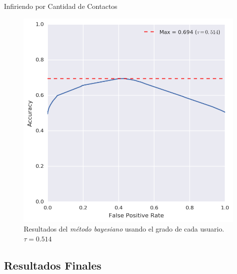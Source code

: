 \documentclass[usenames,dvipsnames,table]{beamer}
\begin{document}
\begin{frame}{Infiriendo por Cantidad de Contactos}
\begin{figure}
		\includegraphics[width=.49\framewidth, height=.37\textheight, keepaspectratio]{bayes/accuracy_contacts.png}

		\caption{Resultados del \emph{método bayesiano} usando el grado de cada usuario. $\tau = 0.514$}
	\end{figure}

\end{frame}

\subsection{Resultados Finales}
\end{document}
